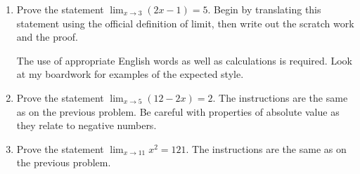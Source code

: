 \documentclass[12pt]{article}
\begin{document}
\begin{enumerate}
\item  Prove the statement $\lim_{x \rightarrow 3} (2x-1) = 5$.  Begin by translating this statement using the official definition of limit, then write out the scratch work and the proof.

The use of appropriate English words as well as calculations is required.  Look at my boardwork for examples of the expected style.


\item  Prove the statement $\lim_{x \rightarrow 5} (12-2x) = 2$.  The instructions are the same as on the previous problem.  Be careful with properties of absolute value as they relate to negative numbers.


\item   Prove the statement $\lim_{x \rightarrow 11} x^2 = 121$.  The instructions are the same as on the previous problem.







\end{enumerate}
\end{document}
